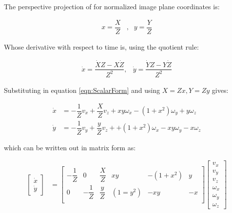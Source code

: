 \documentclass{UoNMCHA}
\numberwithin{equation}{section}
\begin{document}
The perspective projection of for normalized image plane coordinates is:

\begin{equation}
\begin{aligned}
x = \dfrac{X}{Z} & , & y = \dfrac{Y}{Z}
\end{aligned}
\end{equation}

Whose derivative with respect to time is, using the quotient rule:

\begin{equation}
\begin{aligned}
\dot{x} = \dfrac{\dot{X}Z -X\dot{Z}}{Z^2} ,& \dot{y} = \dfrac{\dot{Y}Z -Y\dot{Z}}{Z^2}
\end{aligned}
\end{equation}

Substituting in equation \ref{eqn:ScalarForm} and using $X = Zx, Y = Zy$ gives:

\begin{equation} \label{eqn:ScalarFormsubstituted}
\begin{aligned}
\dot{x} & = -\dfrac{1}{Z}v_{x} + \dfrac{X}{Z} v_{z} + xy\omega_{x} -(1+x^2)\omega_{y} + y\omega_{z} \\
\dot{y} & = -\dfrac{1}{Z}v_{y} + \dfrac{y}{Z} v_{z} + + (1+x^2)\omega_{x} - xy\omega_{y} - x\omega_{z}
\end{aligned}
\end{equation}

which can be written out in matrix form as:

\begin{equation} \label{eqn:pdottovelocity}
\begin{aligned}
\begin{bmatrix}
\dot{x} \\ \dot{y}  
\end{bmatrix}
& =
\begin{bmatrix}
-\dfrac{1}{Z} & 0 & \dfrac{X}{Z} & xy & -(1+x^2) & y \\
0 & -\dfrac{1}{Z} & \dfrac{y}{Z} & (1=y^2) & -xy & -x \\

\end{bmatrix}
\begin{bmatrix}
v_x \\ v_y \\ v_z \\ \omega_{x} \\ \omega_{y} \\ \omega_{z}
\end{bmatrix} 
\end{aligned}
\end{equation}
\end{document}
